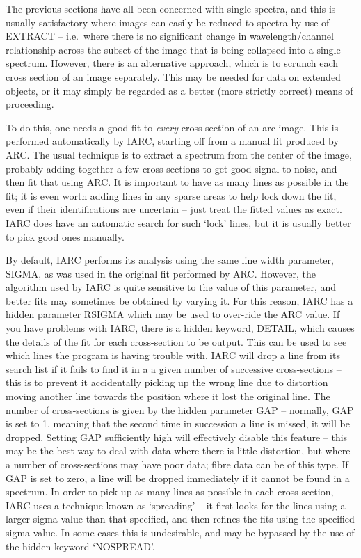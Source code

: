 The previous sections have all been concerned with single spectra,
and this is usually satisfactory where images can easily be reduced
to spectra by use of EXTRACT -- i.e.\ where there is no significant change in
wavelength/channel relationship across the subset of the image that is
being collapsed into a single spectrum.
However, there is an alternative approach, which is to scrunch each cross
section of an image separately.  This may be needed for data on extended
objects, or it may simply be regarded as a better (more strictly correct)
means of proceeding.

To do this, one needs a good fit to {\it every} cross-section of an arc
image.  This is performed automatically by IARC, starting off from a manual
fit produced by ARC.  The usual technique is to extract a spectrum from
the center of the image, probably adding together a few cross-sections to get
good signal to noise, and then fit that using ARC.  It is important to have
as many lines as possible in the fit; it is even worth adding lines in any
sparse areas to help lock down the fit, even if their identifications are
uncertain -- just treat the fitted values as exact.  IARC does have an
automatic search for such `lock' lines, but it is usually better to
pick good ones manually.

By default, IARC performs its analysis using the same line width
parameter, SIGMA, as was used in the original fit performed by ARC.
However, the algorithm used by IARC is quite sensitive to the value
of this parameter, and better fits may sometimes be obtained by varying
it.  For this reason, IARC has a hidden parameter RSIGMA which may be
used to over-ride the ARC value.  If you have problems with IARC, there
is a hidden keyword, DETAIL, which causes the details of the fit for
each cross-section to be output.  This can be used to see which lines
the program is having trouble with.  IARC will drop a line from its
search list if it fails to find it in a a given number of successive
cross-sections -- this is to prevent it accidentally picking up the wrong
line due to distortion moving another line towards the position where it
lost the original line.  The number of cross-sections is given by the
hidden parameter GAP -- normally, GAP is set to 1, meaning that the 
second time in succession a line is missed, it will be dropped.  Setting
GAP sufficiently high will effectively disable this feature -- this may be
the best way to deal with data where there is little distortion, but where a
number of cross-sections may have poor data; fibre data can be of this type.
If GAP is set to zero, a line will be dropped immediately if it cannot be
found in a spectrum.
In order to pick up as many lines as possible in each cross-section, IARC
uses a technique known as `spreading' -- it first looks for the lines using 
a larger sigma value than that specified, and then refines the fits using
the specified sigma value.  In some cases this is undesirable, and may be 
bypassed by the use of the hidden keyword `NOSPREAD'.


